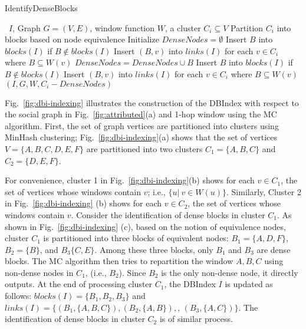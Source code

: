 \begin{algorithm}
\caption{IdentifyDenseBlocks}
\begin{algorithmic}[1] \small
\Require \DBIndex\ $I$, Graph $G=(V,E)$, window function $W$, a cluster $C_i \subseteq V$
\State Partition $C_i$ into blocks based on node equivalence
\State Initialize $DenseNodes = \emptyset$
	\State Insert $B$ into $blocks(I)$ if $B \not\in blocks(I)$
	\State Insert $(B,v)$ into $links(I)$ for each $v \in C_i$ where $B \subseteq W(v)$
	\State $DenseNodes = DenseNodes \cup B$
\EndFor
{}
		\State Insert $B$ into $blocks(I)$ if $B \not\in blocks(I)$
		\State Insert $(B,v)$ into $links(I)$ for each $v \in C_i$ where $B \subseteq W(v)$
	\EndFor
{}
		 $(I,G,W,C_i - DenseNodes)$
	\EndIf
\EndIf
\end{algorithmic}
\label{algo:identify}
\end{algorithm}

Fig.~\ref{fig:dbi-indexing} 
illustrates the construction of the DBIndex with respect to the social graph in 
Fig.~\ref{fig:attributed}(a) and 1-hop window using the MC algorithm.
First, the set of graph vertices are partitioned into clusters using MinHash clustering;
Fig.~\ref{fig:dbi-indexing}(a)
shows that the set of vertices $V = \{A, B, C, D, E, F \}$ are partitioned into two clusters $C_1=\{A, B, C\}$ and $C_2=\{D, E, F\}$. 

For convenience, cluster 1 in 
Fig.~\ref{fig:dbi-indexing}(b) shows for each $v \in C_1$, the set of vertices whose windows contain $v$;
i.e., $\{u |\ v \in W(u)\}$.
Similarly, Cluster 2 in Fig.~\ref{fig:dbi-indexing} (b)
shows for each $v \in C_2$, the set of vertices whose windows contain $v$.
Consider the identification of dense blocks in cluster $C_1$.
As shown in Fig.~\ref{fig:dbi-indexing} (c), based on the notion of equivalence nodes,
cluster $C_1$ is partitioned into three blocks of equivalent nodes:
$B_1=\{A,D,F\}$, $B_2=\{B\}$, and $B_3\{C,E\}$.
Among these three blocks, only
$B_1$ and $B_3$ are dense blocks.
The MC algorithm then tries to repartition the window $A,B,C$ using non-dense nodes in $C_1$,
(i.e., $B_2$). Since $B_2$ is the only non-dense node, it directly outputs.
At the end of processing cluster $C_1$,
the DBIndex $I$ is updated as follows:
$blocks(I) = \{B_1, B_2, B_3\}$ 
and
$links(I) = \{ (B_1,\{A,B,C\}), (B_2, \{A,B\}),$, $(B_3, \{A,C\}) \}$. The identification of dense blocks in cluster $C_2$ 
is of similar process.

